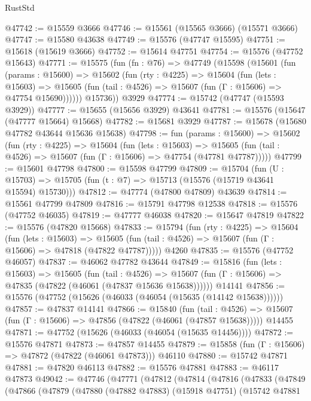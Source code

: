 \begin{lexlean}{RustStd}
\begin{coremodule}
@47742 := @15559 @3666
@47746 := @15561 (@15565 @3666) (@15571 @3666)
@47747 := @15580 @43638
@47749 := @15576 (@47747 @15595)
@47751 := @15618 (@15619 @3666)
@47752 := @15614 @47751
@47754 := @15576 (@47752 @15643)
@47771 := @15575
    (fun (fn : @76) =>
    @47749
      (@15598
        (@15601
          (fun (params : @15600) =>
          @15602
            (fun (rty : @4225) =>
            @15604
              (fun (lets : @15603) =>
              @15605 (fun (tail : @4526) => @15607 (fun (Γ : @15606) => @47754 @15690))))))
        @15736))
    @3929
@47774 := @15742 (@47747 (@15593 @3929))
@47777 := @15655 (@15656 @3929) @43641
@47781 := @15576 (@15647 (@47777 @15664) @15668)
@47782 := @15681 @3929
@47787 := @15678 (@15680 @47782 @43644 @15636 @15638)
@47798 := fun (params : @15600) =>
  @15602
    (fun (rty : @4225) =>
    @15604
      (fun (lets : @15603) =>
      @15605 (fun (tail : @4526) => @15607 (fun (Γ : @15606) => @47754 (@47781 @47787)))))
@47799 := @15601 @47798
@47800 := @15598 @47799
@47809 := @15704
    (fun (U : @15703) => @15705 (fun (t : @7) => @15713 (@15576 (@15719 @43641 @15594) @15730)))
@47812 := @47774 (@47800 @47809) @43639
@47814 := @15561 @47799 @47809
@47816 := @15791 @47798 @12538
@47818 := @15576 (@47752 @46035)
@47819 := @47777 @46038
@47820 := @15647 @47819
@47822 := @15576 (@47820 @15668)
@47833 := @15794
    (fun (rty : @4225) =>
    @15604
      (fun (lets : @15603) =>
      @15605 (fun (tail : @4526) => @15607 (fun (Γ : @15606) => @47818 (@47822 @47787)))))
    @4260
@47835 := @15576 (@47752 @46057)
@47837 := @46062 @47782 @43644
@47849 := @15816
    (fun (lets : @15603) =>
    @15605
      (fun (tail : @4526) =>
      @15607 (fun (Γ : @15606) => @47835 (@47822 (@46061 (@47837 @15636 @15638))))))
    @14141
@47856 := @15576 (@47752 (@15626 (@46033 (@46054 (@15635 (@14142 @15638))))))
@47857 := @47837 @14141
@47866 := @15840
    (fun (tail : @4526) => @15607 (fun (Γ : @15606) => @47856 (@47822 (@46061 (@47857 @15638)))))
    @14455
@47871 := @47752 (@15626 (@46033 (@46054 (@15635 @14456))))
@47872 := @15576 @47871
@47873 := @47857 @14455
@47879 := @15858 (fun (Γ : @15606) => @47872 (@47822 (@46061 @47873))) @46110
@47880 := @15742 @47871
@47881 := @47820 @46113
@47882 := @15576 @47881
@47883 := @46117 @47873
@49042 := @47746
    (@47771
      (@47812
        (@47814
          (@47816
            (@47833
              (@47849
                (@47866
                  (@47879
                    (@47880
                      (@47882 @47883)
                      (@15918 @47751)
                      (@15742
                        @47881

\end{coremodule}
\end{lexlean}
